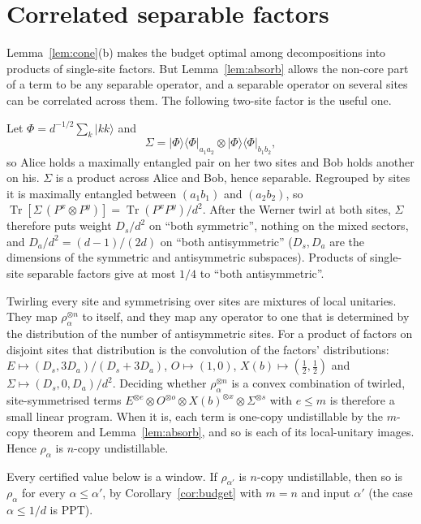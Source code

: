 \documentclass[11pt]{article}
\theoremstyle{remark}
\newcommand{\Tr}{\operatorname{Tr}}
\begin{document}
\section{Correlated separable factors}\label{sec:corr}
Lemma~\ref{lem:cone}(b) makes the budget optimal among decompositions into products of single-site factors. But
Lemma~\ref{lem:absorb} allows the non-core part of a term to be any separable operator, and a separable operator on
several sites can be correlated across them. The following two-site factor is the useful one.

Let $\Phi=d^{-1/2}\sum_k|kk\rangle$ and
\[
\Sigma=|\Phi\rangle\langle\Phi|_{a_1a_2}\otimes|\Phi\rangle\langle\Phi|_{b_1b_2},
\]
so Alice holds a maximally entangled pair on her two sites and Bob holds another on his. $\Sigma$ is a product across
Alice and Bob, hence separable. Regrouped by sites it is maximally entangled between $(a_1b_1)$ and $(a_2b_2)$, so
$\Tr[\Sigma\,(P^x\otimes P^y)]=\Tr(P^xP^y)/d^2$. After the Werner twirl at both sites, $\Sigma$ therefore puts weight
$D_s/d^2$ on ``both symmetric'', nothing on the mixed sectors, and $D_a/d^2=(d-1)/(2d)$ on ``both antisymmetric''
($D_s,D_a$ are the dimensions of the symmetric and antisymmetric subspaces). Products of single-site separable
factors give at most $1/4$ to ``both antisymmetric''.

Twirling every site and symmetrising over sites are mixtures of local unitaries. They map $\rho_\alpha^{\otimes n}$ to
itself, and they map any operator to one that is determined by the distribution of the number of antisymmetric
sites. For a product of factors on disjoint sites that distribution is the convolution of the factors'
distributions: $E\mapsto(D_s,3D_a)/(D_s+3D_a)$, $O\mapsto(1,0)$, $X(b)\mapsto(\tfrac12,\tfrac12)$ and
$\Sigma\mapsto(D_s,0,D_a)/d^2$. Deciding whether $\rho_\alpha^{\otimes n}$ is a convex combination of twirled,
site-symmetrised terms $E^{\otimes e}\otimes O^{\otimes o}\otimes X(b)^{\otimes x}\otimes\Sigma^{\otimes s}$ with
$e\le m$ is therefore a small linear program. When it is, each term is one-copy undistillable by the $m$-copy theorem
and Lemma~\ref{lem:absorb}, and so is each of its local-unitary images. Hence $\rho_\alpha$ is $n$-copy
undistillable.

Every certified value below is a window. If $\rho_{\alpha'}$ is $n$-copy undistillable, then so is $\rho_\alpha$ for
every $\alpha\le\alpha'$, by Corollary~\ref{cor:budget} with $m=n$ and input $\alpha'$ (the case $\alpha\le1/d$ is PPT).
\end{document}
